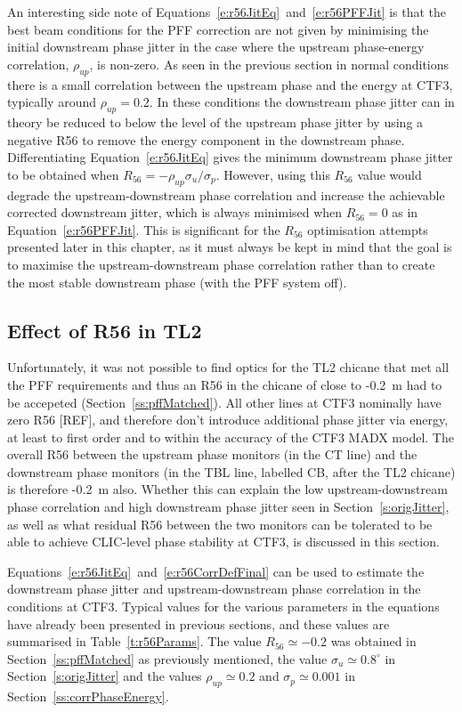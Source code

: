 An interesting side note of Equations~\ref{e:r56JitEq}~and~\ref{e:r56PFFJit} is that the best beam conditions for the PFF correction are not given by minimising the initial downstream phase jitter in the case where the upstream phase-energy correlation, \(\rho_{up}\), is non-zero. As seen in the previous section in normal conditions there is a small correlation between the upstream phase and the energy at CTF3, typically around \(\rho_{up}=0.2\). In these conditions the downstream phase jitter can in theory be reduced to below the level of the upstream phase jitter by using a negative R56 to remove the energy component in the downstream phase. Differentiating Equation~\ref{e:r56JitEq} gives the minimum downstream phase jitter to be obtained when \(R_{56} = -\rho_{up}\sigma_u/\sigma_p\). However, using this \(R_{56}\) value would degrade the upstream-downstream phase correlation and increase the achievable corrected downstream jitter, which is always minimised when \(R_{56} = 0\) as in Equation~\ref{e:r56PFFJit}. This is significant for the \(R_{56}\) optimisation attempts presented later in this chapter, as it must always be kept in mind that the goal is to maximise the upstream-downstream phase correlation rather than to create the most stable downstream phase (with the PFF system off).

\subsection{Effect of R56 in TL2}
\label{ss:r56TL2Effect}

Unfortunately, it was not possible to find optics for the TL2 chicane that met all the PFF requirements and thus an R56 in the chicane of close to -0.2~m had to be accepeted (Section~\ref{ss:pffMatched}). All other lines at CTF3 nominally have zero R56 [REF], and therefore don't introduce additional phase jitter via energy, at least to first order and to within the accuracy of the CTF3 MADX model. The overall R56 between the upstream phase monitors (in the CT line) and the downstream phase monitors (in the TBL line, labelled CB, after the TL2 chicane) is therefore -0.2~m also. Whether this can explain the low upstream-downstream phase correlation and high downstream phase jitter seen in Section~\ref{s:origJitter}, as well as what residual R56 between the two monitors can be tolerated to be able to achieve CLIC-level phase stability at CTF3, is discussed in this section.

Equations~\ref{e:r56JitEq}~and~\ref{e:r56CorrDefFinal} can be used to estimate the downstream phase jitter and upstream-downstream phase correlation in the conditions at CTF3. Typical values for the various parameters in the equations have already been presented in previous sections, and these values are summarised in Table~\ref{t:r56Params}. The value \(R_{56}\simeq -0.2\) was obtained in Section~\ref{ss:pffMatched} as previously mentioned, the value \(\sigma_u\simeq0.8^\circ\) in Section~\ref{s:origJitter} and the values \(\rho_{up}\simeq 0.2\) and \(\sigma_p\simeq 0.001\) in Section~\ref{ss:corrPhaseEnergy}.

